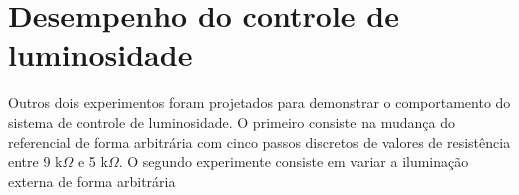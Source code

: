 \section{Desempenho do controle de luminosidade}

Outros dois experimentos foram projetados para demonstrar o comportamento do sistema de controle de luminosidade. O primeiro consiste na mudança do referencial de forma arbitrária com cinco passos discretos de valores de resistência entre 9 k$\Omega$ e 5 k$\Omega$. O segundo experimente consiste em variar a iluminação externa de forma arbitrária 

